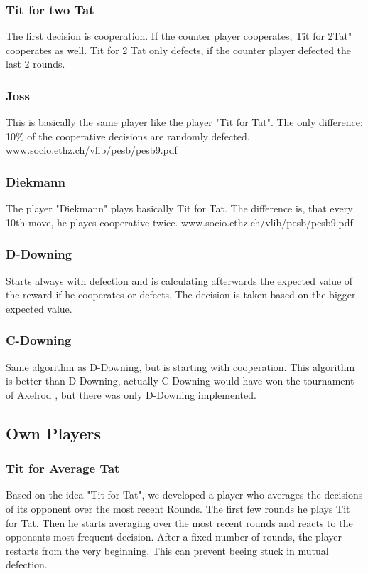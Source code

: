 \documentclass[11pt,twoside]{article}
\begin{document}
\subsubsection{Tit for two Tat}
The first decision is cooperation. If the counter player cooperates, Tit for 2Tat" cooperates as well. Tit for 2 Tat only defects, if the counter player defected the last 2 rounds.

\subsubsection{Joss}
This is basically the same player like the player "Tit for Tat". The only difference: 10\% of the cooperative decisions are randomly defected.
www.socio.ethz.ch/vlib/pesb/pesb9.pdf

\subsubsection{Diekmann}
The player "Diekmann" plays basically Tit for Tat. The difference is, that every 10th move, he playes cooperative twice.
www.socio.ethz.ch/vlib/pesb/pesb9.pdf

\subsubsection{D-Downing}

Starts always with defection and is calculating afterwards the expected value of the reward if he cooperates or defects. The decision is taken based on the bigger expected value. 

\subsubsection{C-Downing}

Same algorithm as D-Downing, but is starting with cooperation. This algorithm is better than D-Downing, actually C-Downing would have won the tournament of Axelrod \cite{evolution of cooperation}, but there was only D-Downing implemented.

\subsection{Own Players}

\subsubsection{Tit for Average Tat}
Based on the idea "Tit for Tat", we developed a player who averages the decisions of its opponent over the most recent Rounds. The first few rounds he plays Tit for Tat. Then he starts averaging over the most recent rounds and reacts to the opponents most frequent decision. After a fixed number of rounds, the player restarts from the very beginning. This can prevent beeing stuck in mutual defection.
\end{document}
